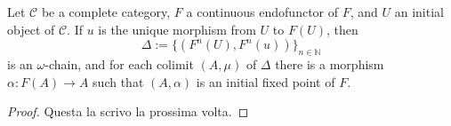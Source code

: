 \begin{thm}
  Let \(\mathcal{C}\) be a complete category, \(F\) a continuous endofunctor of \(F\), and \(U\) an initial object of \(\mathcal{C}\). If \(u\) is the unique morphism from \(U\) to \(F(U)\), then
  \begin{equation}
    \Delta := \lbrace (F^n(U),F^n(u)) \rbrace_{n \in \mathbb{N}}
  \end{equation}
  is an \(\omega\)-chain, and for each colimit \((A,\mu)\) of \(\Delta\) there is a morphism \(\alpha \colon F(A) \to A\) such that \((A,\alpha)\) is an initial fixed point of \(F\).
\end{thm}
\begin{proof}
  Questa la scrivo la prossima volta.
\end{proof}